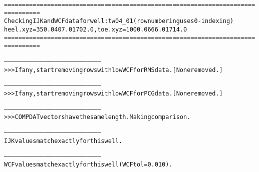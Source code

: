 \begin{alltt}
================================================================================
Checking IJK and WCF data for well: tw04_01 (row numbering uses 0-indexing)
heel.xyz = 350.0 407.0 1702.0, toe.xyz = 1000.0 666.0 1714.0
================================================================================

--------------------------------------------------------------------------------
>>> If any, start removing rows with low WCF for RMS data. [None removed.]

--------------------------------------------------------------------------------
>>> If any, start removing rows with low WCF for PCG data. [None removed.]

--------------------------------------------------------------------------------
>>> COMPDAT vectors have the same length. Making comparison.

--------------------------------------------------------------------------------
IJK values match exactly for this well.

--------------------------------------------------------------------------------
WCF values match exactly for this well (WCF tol = 0.010).
\end{alltt}

